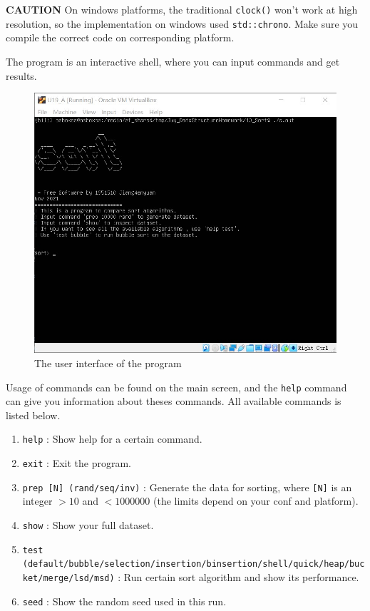 \documentclass[cn,black,12pt,normal]{elegantnote}
\begin{document}
\textbf{CAUTION} On windows platforms, the traditional \lstinline{clock()} won't work at high resolution, so the implementation on windows used \lstinline{std::chrono}. Make sure you compile the correct code on corresponding platform.

The program is an interactive shell, where you can input commands and get results.

\begin{figure}[H]
    \centering
    \includegraphics[width=0.7\linewidth]{image/sort_01.jpg}
    \caption{The user interface of the program}
\end{figure}

Usage of commands can be found on the main screen, and the \lstinline{help} command can give you information about theses commands.  All available commands is listed below.

\begin{enumerate}
    \item \lstinline{help} : Show help for a certain command.
    \item \lstinline{exit} : Exit the program.
    \item \lstinline{prep [N] (rand/seq/inv)} : Generate the data for sorting, where \lstinline{[N]} is an integer $> 10$ and $< 1000000$ (the limits depend on your conf and platform).
    \item \lstinline{show} : Show your full dataset.
    \item \lstinline{test (default/bubble/selection/insertion/binsertion/shell/quick/heap/bucket/merge/lsd/msd)} : Run certain sort algorithm and show its performance.
    \item \lstinline{seed} : Show the random seed used in this run.
\end{enumerate}
\end{document}
